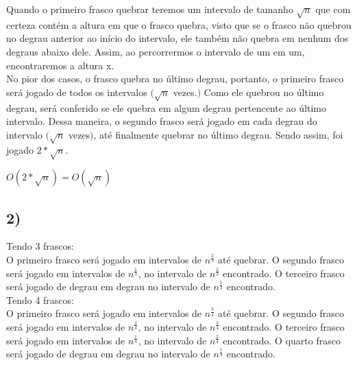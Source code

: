 \documentclass[10pt,a4paper]{article}
\begin{document}
\vspace{1cm}

	Quando o primeiro frasco quebrar teremos um intervalo de tamanho $ \sqrt{n} $ que com certeza contém a altura em que o frasco quebra, visto que se o frasco não quebrou no degrau anterior ao início do intervalo, ele também não quebra em nenhum dos degraus abaixo dele. Assim, ao percorrermos o intervalo de um em um, encontraremos a altura x.\\
	
	No pior dos casos, o frasco quebra no último degrau, portanto, o primeiro frasco será jogado de todos os intervalos $(\sqrt{n}$ vezes.$)$ Como ele quebrou no último degrau, será conferido se ele quebra em algum degrau pertencente ao último intervalo. Dessa maneira, o segundo frasco será jogado em cada degrau do intervalo $(\sqrt{n}$ vezes$)$, até finalmente quebrar no último degrau. Sendo assim, foi jogado $2*\sqrt{n}$.\\
	
	\begin{center}
		$O(2*\sqrt{n}) = O(\sqrt{n})$	
	
	\end{center}
	
	
	\subsection*{2)}
	
	\vspace{0.5cm}
	
	\tab Tendo 3 frascos:\\

\hspace{1cm} O primeiro frasco será jogado em intervalos de $n^{\frac{2}{3}}$ até quebrar. O segundo frasco será jogado em intervalos de $n^\frac{1}{3}$, no intervalo de $n^{\frac{2}{3}}$ encontrado. O terceiro frasco será jogado de degrau em degrau no intervalo de $n^{\frac{1}{3}}$ encontrado.\\


Tendo 4 frascos:\\

\hspace{1cm} O primeiro frasco será jogado em intervalos de $n^{\frac{3}{4}}$ até quebrar. O segundo frasco será jogado em intervalos de $n^{\frac{2}{4}}$, no intervalo de $n^{\frac{3}{4}}$ encontrado. O terceiro frasco será jogado em intervalos de $n^{\frac{1}{4}}$, no intervalo de $n^{\frac{2}{4}}$ encontrado. O quarto frasco será jogado de degrau em degrau no intervalo de $n^{\frac{1}{4}}$ encontrado.\\
\end{document}
